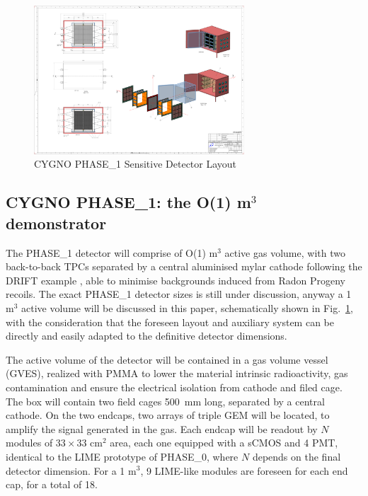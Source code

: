 \documentclass[physics,article,submit,moreauthors,pdftex]{Definitions/mdpi}
\begin{document}
\begin{figure}[!t]
\centering
 \includegraphics[width=0.7\textwidth]{CygnoDetector.pdf}
 \caption{CYGNO PHASE\_1 Sensitive Detector Layout}
 \label{fig:detector}
 \end{figure}
 
\subsection{CYGNO PHASE\_1: the O(1) m$^3$ demonstrator}\label{sec:phase1}
The PHASE\_1 detector will comprise of  O(1) m$^3$ active gas volume, with two back-to-back TPCs separated by a central aluminised mylar cathode following the DRIFT example \cite{Battat:2015rna}, able to minimise backgrounds induced from Radon Progeny recoils. 
The exact PHASE\_1 detector sizes is still under discussion, anyway a 1 m$^3$ active volume will be discussed in this paper, schematically shown in Fig.~\ref{fig:detector},
with the consideration that the foreseen layout and auxiliary system can be directly and easily adapted to the definitive detector dimensions.

The active volume of the detector will be contained in a gas volume vessel (GVES), realized with PMMA to lower the material intrinsic radioactivity, gas contamination and ensure the electrical isolation from cathode and filed cage. 
The box will contain two field cages 500~mm long, separated by a central cathode. On the two endcaps, two arrays of triple GEM will be located, to amplify the signal generated in the gas. Each endcap will be readout by $N$ modules of $33 \times 33$ cm$^2$  area, each one equipped with a sCMOS and 4 PMT, identical to the LIME prototype of PHASE\_0, where $N$ depends on the final detector dimension. For a 1 m$^3$, 9 LIME-like modules are foreseen for each end cap, for a total of 18.
\end{document}

